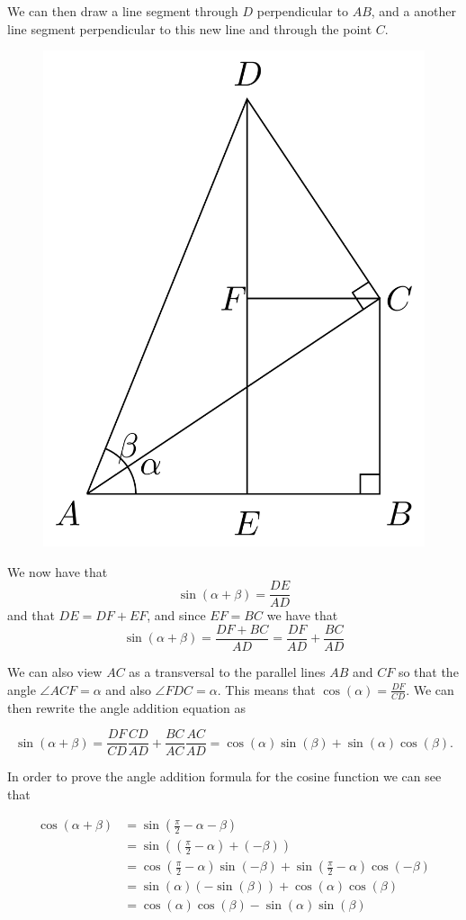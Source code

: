 \documentclass[
]{book}
\theoremstyle{definition}
\theoremstyle{definition}
\theoremstyle{definition}
\theoremstyle{definition}
\theoremstyle{remark}
\begin{document}
We can then draw a line segment through \(D\) perpendicular to \(AB\), and a another line segment perpendicular to this new line and through the point \(C\).

\begin{figure}

{\centering \includegraphics[width=0.3\linewidth]{tikz/angle-addition-sine2} 

}

\end{figure}

We now have that \[\sin\left(\alpha+\beta\right) = \frac{DE}{AD}\] and that \(DE=DF+EF\), and since \(EF=BC\) we have that \[\sin\left(\alpha+\beta\right) = \frac{DF+BC}{AD}= \frac{DF}{AD} + \frac{BC}{AD}\]

We can also view \(AC\) as a transversal to the parallel lines \(AB\) and \(CF\) so that the angle \(\angle ACF=\alpha\) and also \(\angle FDC = \alpha\). This means that \(\cos(\alpha) = \frac{DF}{CD}\). We can then rewrite the angle addition equation as

\[\sin\left(\alpha+\beta\right)  = \frac{DF}{CD}\frac{CD}{AD} + \frac{BC}{AC}\frac{AC}{AD} =\cos(\alpha) \sin(\beta) + \sin(\alpha) \cos(\beta).\]

In order to prove the angle addition formula for the cosine function we can see that

\begin{align*}
\cos(\alpha+\beta) &= \sin\left(\frac{\pi}{2} - \alpha - \beta\right) \\
&= \sin \left( \left(\frac{\pi}{2}-\alpha\right) + (-\beta) \right) \\
&= \cos\left(\frac{\pi}{2}-\alpha\right) \sin(-\beta)+\sin\left(\frac{\pi}{2}-\alpha\right)\cos(-\beta) \\
&= \sin(\alpha)\left(-\sin(\beta)\right) +\cos(\alpha)\cos(\beta) \\
&= \cos(\alpha) \cos(\beta) - \sin(\alpha) \sin(\beta)
\end{align*}
\end{document}
